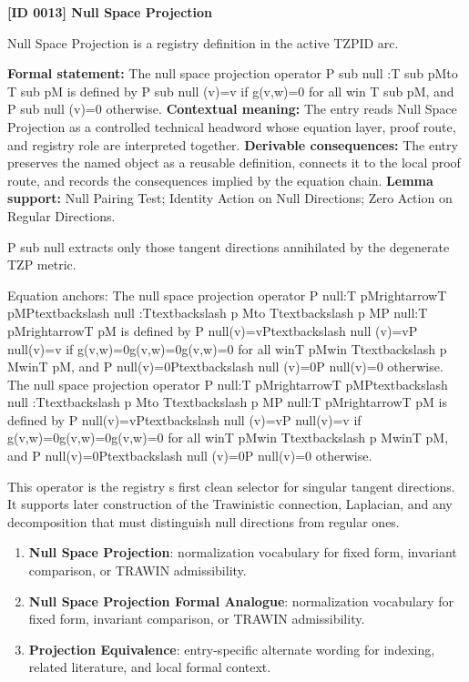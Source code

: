 \clearpage
\noindent\textbf{[ID 0013] Null Space Projection}\par
\vspace{0.35em}
\begingroup\small
{}
Null Space Projection is a registry definition in the active TZPID arc.

\begingroup\footnotesize\setlength{\emergencystretch}{3em}\sloppy
\textbf{Formal statement:} The null space projection operator P sub null :T sub pMto T sub pM is defined by P sub null (v)=v if g(v,w)=0 for all win T sub pM, and P sub null (v)=0 otherwise. \textbf{Contextual meaning:} The entry reads Null Space Projection as a controlled technical headword whose equation layer, proof route, and registry role are interpreted together. \textbf{Derivable consequences:} The entry preserves the named object as a reusable definition, connects it to the local proof route, and records the consequences implied by the equation chain. \textbf{Lemma support:} Null Pairing Test; Identity Action on Null Directions; Zero Action on Regular Directions.\par
\endgroup

P sub null extracts only those tangent directions annihilated by the degenerate TZP metric.

Equation anchors: The null space projection operator P null:T pMrightarrowT pMPtextbackslash null :Ttextbackslash p Mto Ttextbackslash p MP null:T pMrightarrowT pM is defined by P null(v)=vPtextbackslash null (v)=vP null(v)=v if g(v,w)=0g(v,w)=0g(v,w)=0 for all winT pMwin Ttextbackslash p MwinT pM, and P null(v)=0Ptextbackslash null (v)=0P null(v)=0 otherwise. The null space projection operator P null:T pMrightarrowT pMPtextbackslash null :Ttextbackslash p Mto Ttextbackslash p MP null:T pMrightarrowT pM is defined by P null(v)=vPtextbackslash null (v)=vP null(v)=v if g(v,w)=0g(v,w)=0g(v,w)=0 for all winT pMwin Ttextbackslash p MwinT pM, and P null(v)=0Ptextbackslash null (v)=0P null(v)=0 otherwise.

This operator is the registry s first clean selector for singular tangent directions. It supports later construction of the Trawinistic connection, Laplacian, and any decomposition that must distinguish null directions from regular ones.
\endgroup

\begingroup\footnotesize\sloppy
\begin{enumerate}[leftmargin=1.35em,itemsep=1pt,topsep=1pt,parsep=0pt]
\item \textbf{Null Space Projection}: normalization vocabulary for fixed form, invariant comparison, or TRAWIN admissibility.
\item \textbf{Null Space Projection Formal Analogue}: normalization vocabulary for fixed form, invariant comparison, or TRAWIN admissibility.
\item \textbf{Projection Equivalence}: entry-specific alternate wording for indexing, related literature, and local formal context.
\end{enumerate}
\endgroup

